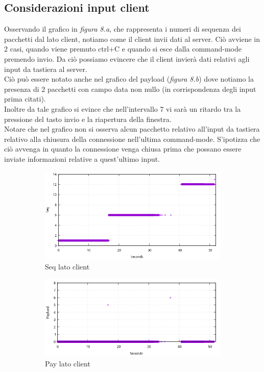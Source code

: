 \documentclass[12pt]{article}
\begin{document}
\subsection{Considerazioni input client}
Osservando il grafico in \textit{figura 8.a}, che rappresenta i numeri di sequenza dei pacchetti dal lato client, notiamo come il client invii dati al server. Ciò avviene in 2 casi, quando viene premuto ctrl+C e quando si esce dalla command-mode premendo invio.
Da ciò possiamo evincere che il client invierà dati relativi agli input da tastiera al server.\\
Ciò può essere notato anche nel grafico del payload (\textit{figura 8.b}) dove notiamo la presenza di 2 pacchetti con campo data non nullo (in corrispondenza degli input prima citati).\\
Inoltre da tale grafico si evince che nell'intervallo 7 vi sarà un ritardo tra la pressione del tasto invio e la riapertura della finestra.\\
Notare che nel grafico non si osserva alcun pacchetto relativo all'input da tastiera relativo alla chiusura della connessione nell'ultima command-mode.
S'ipotizza che ciò avvenga in quanto la connessione venga chiusa prima che possano essere inviate informazioni relative a quest'ultimo input.

\begin{figure}[H]
	\begin{subfigure}[l]{0.45\linewidth}
		\includegraphics[width=\linewidth]{client_seq_point.png}
		\caption{Seq lato client}
	\end{subfigure}	
	\begin{subfigure}[r]{0.55\linewidth}
		\includegraphics[width=\linewidth]{client_pay_point.png}
		\caption{Pay lato client}
	\end{subfigure}
	\caption{}
\end{figure}
\newpage
\end{document}
